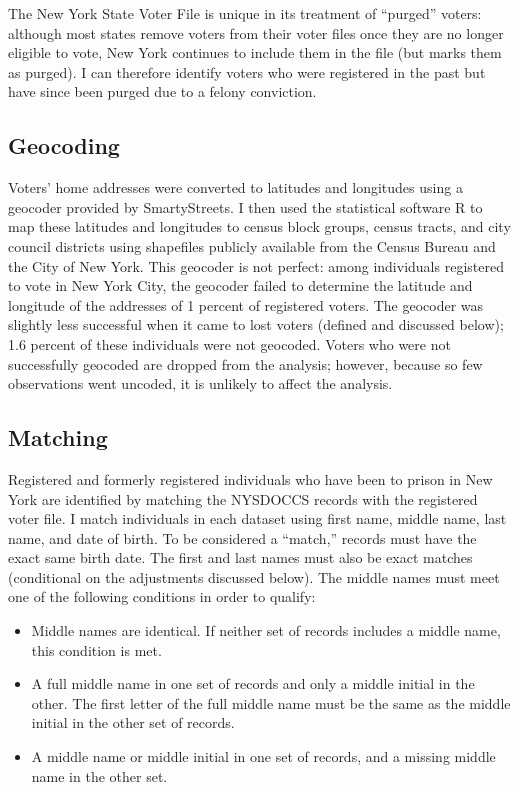 \documentclass[]{article}
\providecommand{\tightlist}{%
  \setlength{\itemsep}{0pt}\setlength{\parskip}{0pt}}
\begin{document}
The New York State Voter File is unique in its treatment of ``purged'' voters: although most states remove voters from their voter files once they are no longer eligible to vote, New York continues to include them in the file (but marks them as purged). I can therefore identify voters who were registered in the past but have since been purged due to a felony conviction.

\hypertarget{geocoding}{%
\subsection*{Geocoding}\label{geocoding}}

Voters' home addresses were converted to latitudes and longitudes using a geocoder provided by SmartyStreets. I then used the statistical software R to map these latitudes and longitudes to census block groups, census tracts, and city council districts using shapefiles publicly available from the Census Bureau and the City of New York. This geocoder is not perfect: among individuals registered to vote in New York City, the geocoder failed to determine the latitude and longitude of the addresses of 1 percent of registered voters. The geocoder was slightly less successful when it came to lost voters (defined and discussed below); 1.6 percent of these individuals were not geocoded. Voters who were not successfully geocoded are dropped from the analysis; however, because so few observations went uncoded, it is unlikely to affect the analysis.

\hypertarget{matching}{%
\subsection*{Matching}\label{matching}}

Registered and formerly registered individuals who have been to prison in New York are identified by matching the NYSDOCCS records with the registered voter file. I match individuals in each dataset using first name, middle name, last name, and date of birth. To be considered a ``match,'' records must have the exact same birth date. The first and last names must also be exact matches (conditional on the adjustments discussed below). The middle names must meet one of the following conditions in order to qualify:

\begin{itemize}
\tightlist
\item
  Middle names are identical. If neither set of records includes a middle name, this condition is met.
\item
  A full middle name in one set of records and only a middle initial in the other. The first letter of the full middle name must be the same as the middle initial in the other set of records.
\item
  A middle name or middle initial in one set of records, and a missing middle name in the other set.
\end{itemize}
\end{document}
